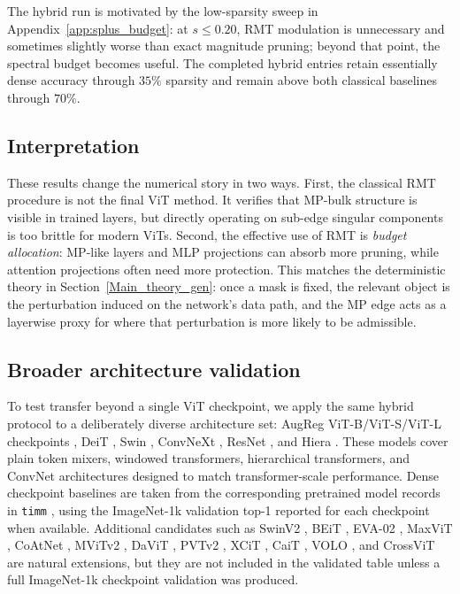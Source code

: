 \documentclass[11pt]{article}
\theoremstyle{plain}
\theoremstyle{definition}
\theoremstyle{remark}
\newcommand{\1}{\mathbf{1}}
\begin{document}
The hybrid run is motivated by the low-sparsity sweep in Appendix~\ref{app:splus_budget}: at \(s\le0.20\), RMT modulation is unnecessary and sometimes slightly worse than exact magnitude pruning; beyond that point, the spectral budget becomes useful.  The completed hybrid entries retain essentially dense accuracy through \(35\%\) sparsity and remain above both classical baselines through \(70\%\).

\subsection{Interpretation}
\label{subsec:current_numerics_interpretation}

These results change the numerical story in two ways.  First, the classical RMT procedure is not the final ViT method.  It verifies that MP-bulk structure is visible in trained layers, but directly operating on sub-edge singular components is too brittle for modern ViTs.  Second, the effective use of RMT is \emph{budget allocation}: MP-like layers and MLP projections can absorb more pruning, while attention projections often need more protection.  This matches the deterministic theory in Section~\ref{Main_theory_gen}: once a mask is fixed, the relevant object is the perturbation induced on the network's data path, and the MP edge acts as a layerwise proxy for where that perturbation is more likely to be admissible.

\subsection{Broader architecture validation}
\label{subsec:architecture_validation}

To test transfer beyond a single ViT checkpoint, we apply the same hybrid protocol to a deliberately diverse architecture set: AugReg ViT-B/ViT-S/ViT-L checkpoints \cite{dosovitskiy2021image,steiner2022how}, DeiT \cite{touvron2021training}, Swin \cite{liu2021swin}, ConvNeXt \cite{liu2022convnet}, ResNet \cite{he2016deep}, and Hiera \cite{ryali2023hiera}.  These models cover plain token mixers, windowed transformers, hierarchical transformers, and ConvNet architectures designed to match transformer-scale performance.  Dense checkpoint baselines are taken from the corresponding pretrained model records in \texttt{timm} \cite{rw2019timm}, using the ImageNet-1k validation top-1 reported for each checkpoint when available.  Additional candidates such as SwinV2 \cite{liu2022swinv2}, BEiT \cite{bao2022beit}, EVA-02 \cite{fang2023eva02}, MaxViT \cite{tu2022maxvit}, CoAtNet \cite{dai2021coatnet}, MViTv2 \cite{li2022mvitv2}, DaViT \cite{ding2022davit}, PVTv2 \cite{wang2022pvtv2}, XCiT \cite{elnouby2021xcit}, CaiT \cite{touvron2021going}, VOLO \cite{yuan2021volo}, and CrossViT \cite{chen2021crossvit} are natural extensions, but they are not included in the validated table unless a full ImageNet-1k checkpoint validation was produced.
\end{document}
